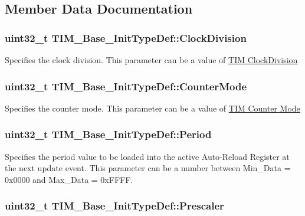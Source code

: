 \subsection{Member Data Documentation}
\hypertarget{struct_t_i_m___base___init_type_def_ade59c3a547a5409da845592f30596d17}{
\subsubsection[{Clock\-Division}]{\setlength{\rightskip}{0pt plus 5cm}uint32\-\_\-t T\-I\-M\-\_\-\-Base\-\_\-\-Init\-Type\-Def\-::\-Clock\-Division}}\label{struct_t_i_m___base___init_type_def_ade59c3a547a5409da845592f30596d17}
Specifies the clock division. This parameter can be a value of \hyperlink{group___t_i_m___clock_division}{T\-I\-M Clock\-Division} \hypertarget{struct_t_i_m___base___init_type_def_a16d0c02a8f35426360a64c0706656e35}{
\subsubsection[{Counter\-Mode}]{\setlength{\rightskip}{0pt plus 5cm}uint32\-\_\-t T\-I\-M\-\_\-\-Base\-\_\-\-Init\-Type\-Def\-::\-Counter\-Mode}}\label{struct_t_i_m___base___init_type_def_a16d0c02a8f35426360a64c0706656e35}
Specifies the counter mode. This parameter can be a value of \hyperlink{group___t_i_m___counter___mode}{T\-I\-M Counter Mode} \hypertarget{struct_t_i_m___base___init_type_def_a8fab2bc184bb756763ff59c729b5be55}{
\subsubsection[{Period}]{\setlength{\rightskip}{0pt plus 5cm}uint32\-\_\-t T\-I\-M\-\_\-\-Base\-\_\-\-Init\-Type\-Def\-::\-Period}}\label{struct_t_i_m___base___init_type_def_a8fab2bc184bb756763ff59c729b5be55}
Specifies the period value to be loaded into the active Auto-\/\-Reload Register at the next update event. This parameter can be a number between Min\-\_\-\-Data = 0x0000 and Max\-\_\-\-Data = 0x\-F\-F\-F\-F. \hypertarget{struct_t_i_m___base___init_type_def_afc886119e6709bb576d25b5cf8d12d92}{
\subsubsection[{Prescaler}]{\setlength{\rightskip}{0pt plus 5cm}uint32\-\_\-t T\-I\-M\-\_\-\-Base\-\_\-\-Init\-Type\-Def\-::\-Prescaler}}\label{struct_t_i_m___base___init_type_def_afc886119e6709bb576d25b5cf8d12d92}
